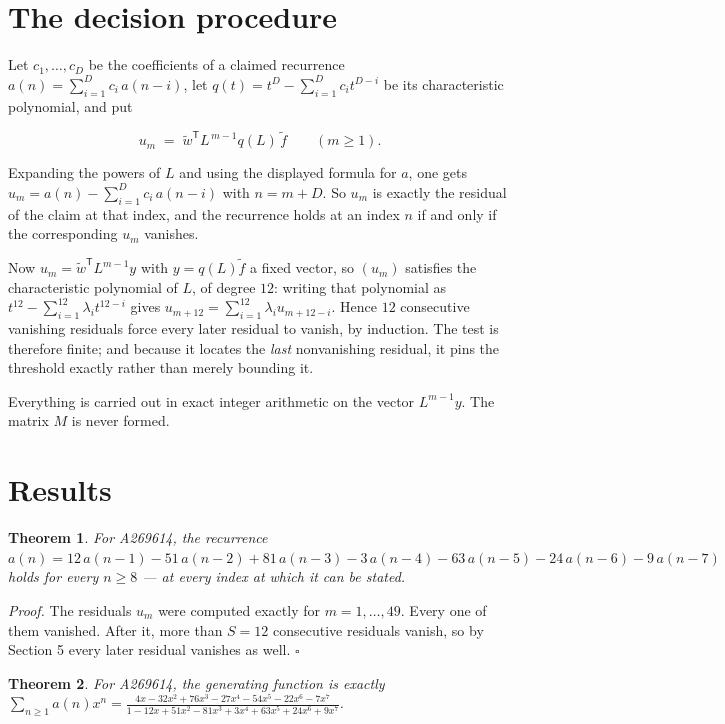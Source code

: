 \documentclass[11pt]{article}
\newtheorem{theorem}{Theorem}
\theoremstyle{definition}
\begin{document}
\section{The decision procedure}

Let $c_1,\dots,c_D$ be the coefficients of a claimed recurrence $a(n) = \sum_{i=1}^{D} c_i\,a(n-i)$, let $q(t) = t^{D} - \sum_{i=1}^{D} c_i t^{D-i}$ be its characteristic polynomial, and put

\[u_m \;=\; \tilde w^{\mathsf T} L^{\,m-1} q(L)\,\tilde f \qquad (m \ge 1).\]

Expanding the powers of $L$ and using the displayed formula for $a$, one gets $u_m = a(n) - \sum_{i=1}^{D} c_i\,a(n-i)$ with $n = m + D$. So $u_m$ is exactly the residual of the claim at that index, and the recurrence holds at an index $n$ if and only if the corresponding $u_m$ vanishes.

Now $u_m = \tilde w^{\mathsf T} L^{m-1} y$ with $y = q(L)\tilde f$ a fixed vector, so $(u_m)$ satisfies the characteristic polynomial of $L$, of degree $12$: writing that polynomial as $t^{12} - \sum_{i=1}^{12} \lambda_i t^{12-i}$ gives $u_{m+12} = \sum_{i=1}^{12} \lambda_i u_{m+12-i}$. Hence $12$ consecutive vanishing residuals force every later residual to vanish, by induction. The test is therefore finite; and because it locates the {\itshape last} nonvanishing residual, it pins the threshold exactly rather than merely bounding it.

Everything is carried out in exact integer arithmetic on the vector $L^{m-1}y$. The matrix $M$ is never formed.

\section{Results}

\begin{theorem} For A269614, the recurrence $a(n) = 12\,a(n-1) - 51\,a(n-2) + 81\,a(n-3) - 3\,a(n-4) - 63\,a(n-5) - 24\,a(n-6) - 9\,a(n-7)$ holds for every $n \ge 8$ --- at every index at which it can be stated.\end{theorem}

{\itshape Proof.} The residuals $u_m$ were computed exactly for $m = 1,\dots,49$. Every one of them vanished. After it, more than $S = 12$ consecutive residuals vanish, so by Section 5 every later residual vanishes as well. $\square$

\begin{theorem} For A269614, the generating function is exactly $\sum_{n\ge 1} a(n)x^n = \frac{4x - 32x^{2} + 76x^{3} - 27x^{4} - 54x^{5} - 22x^{6} - 7x^{7}}{1 - 12x + 51x^{2} - 81x^{3} + 3x^{4} + 63x^{5} + 24x^{6} + 9x^{7}}$.\end{theorem}
\end{document}
